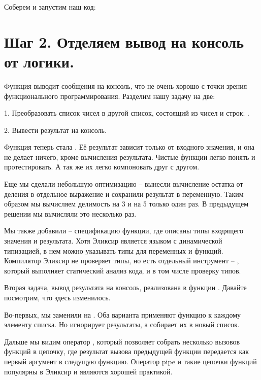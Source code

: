 Соберем и запустим наш код:


\section{Шаг 2. Отделяем вывод на консоль от логики.}

Функция  выводит сообщения на консоль, что не очень хорошо с точки зрения функционального программирования. Разделим нашу задачу на две:

1. Преобразовать список чисел  в другой список, состоящий из чисел и строк: .

2. Вывести результат на консоль.



Функция  теперь стала . Её результат зависит только от входного значения, и она не делает ничего, кроме вычисления результата. Чистые функции легко понять и протестировать. А так же их легко компоновать друг с другом.

Еще мы сделали небольшую оптимизацию -- вынесли вычисление остатка от деления в отдельное выражение и сохранили результат в переменную. Таким образом мы вычисляем делимость на 3 и на 5 только один раз. В предыдущем решении мы вычисляли это несколько раз.

Мы также добавили  -- спецификацию функции, где описаны типы входящего значения и результата. Хотя Эликсир является языком с динамической типизацией, в нем можно указывать типы для переменных и функций. Компилятор Эликсир не проверяет типы, но есть отдельный инструмент -- , который выполняет статический анализ кода, и в том числе проверку типов.

Вторая задача, вывод результата на консоль, реализована в функции . Давайте посмотрим, что здесь изменилось.

Во-первых, мы заменили  на . Оба варианта применяют функцию к каждому элементу списка. Но  игнорирует результаты, а  собирает их в новый список.

Дальше мы видим оператор , который позволяет собрать несколько вызовов функций в цепочку, где результат вызова предыдущей функции передается как первый аргумент в следущую функцию. Оператор pipe и такие цепочки функций популярны в Эликсир и являются хорошей практикой.

